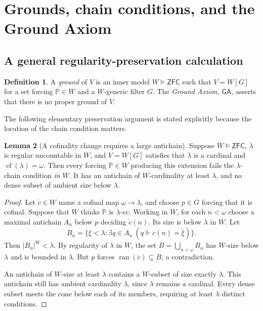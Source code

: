 \documentclass[11pt,letterpaper]{article}
\theoremstyle{definition}
\newtheorem{definition}{Definition}[section]
\newtheorem{lemma}[definition]{Lemma}
\newcommand{\ZFC}{\mathsf{ZFC}}
\newcommand{\cf}{\operatorname{cf}}
\newcommand{\GA}{\mathsf{GA}}
\newcommand{\ran}{\operatorname{ran}}
\theoremstyle{remark}
\begin{document}
\section{Grounds, chain conditions, and the Ground Axiom}\label{sec:grounds}

\subsection{A general regularity-preservation calculation}

\begin{definition}
A \emph{ground} of $V$ is an inner model $W\models\ZFC$ such that $V=W[G]$ for a set forcing $\mathbb P\in W$ and a $W$-generic filter $G$. The \emph{Ground Axiom}, $\GA$, asserts that there is no proper ground of $V$.
\end{definition}

The following elementary preservation argument is stated explicitly because the location of the chain condition matters.

\begin{lemma}[A cofinality change requires a large antichain]\label{lem:forcing}
Suppose $W\models\ZFC$, $\lambda$ is regular uncountable in $W$, and $V=W[G]$ satisfies that $\lambda$ is a cardinal and $\cf(\lambda)=\omega$. Then every forcing $\mathbb P\in W$ producing this extension fails the $\lambda$-chain condition \emph{in $W$}. It has an antichain of $W$-cardinality at least $\lambda$, and no dense subset of ambient size below $\lambda$.
\end{lemma}

\begin{proof}
Let $\dot c\in W$ name a cofinal map $\omega\to\lambda$, and choose $p\in G$ forcing that it is cofinal. Suppose that $W$ thinks $\mathbb P$ is $\lambda$-cc. Working in $W$, for each $n<\omega$ choose a maximal antichain $A_n$ below $p$ deciding $\dot c(n)$. Its size is below $\lambda$ in $W$. Let
\[
 B_n=\{\xi<\lambda:\exists q\in A_n\ (q\Vdash\dot c(n)=\check\xi)\}.
\]
Then $|B_n|^W<\lambda$. By regularity of $\lambda$ in $W$, the set $B=\bigcup_{n<\omega}B_n$ has $W$-size below $\lambda$ and is bounded in $\lambda$. But $p$ forces $\ran(\dot c)\subseteq B$, a contradiction.

An antichain of $W$-size at least $\lambda$ contains a $W$-subset of size exactly $\lambda$. This antichain still has ambient cardinality $\lambda$, since $\lambda$ remains a cardinal. Every dense subset meets the cone below each of its members, requiring at least $\lambda$ distinct conditions.
\end{proof}
\end{document}
